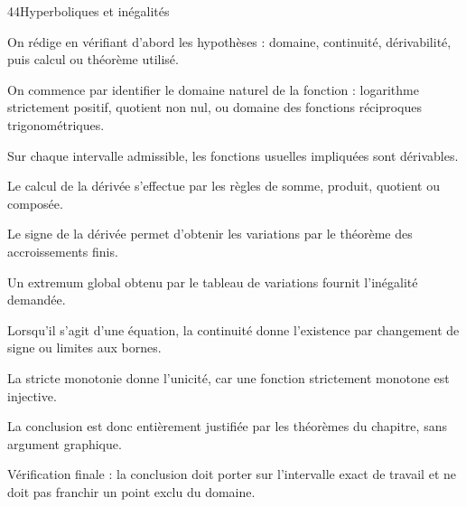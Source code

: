 \documentclass[11pt,a4paper]{article}
\begin{document}
\begin{corrbox}{44}{Hyperboliques et inégalités}

\begin{methodebox}
On rédige en vérifiant d'abord les hypothèses : domaine, continuité, dérivabilité, puis calcul ou théorème utilisé.
\end{methodebox}

On commence par identifier le domaine naturel de la fonction : logarithme strictement positif, quotient non nul, ou domaine des fonctions réciproques trigonométriques.


Sur chaque intervalle admissible, les fonctions usuelles impliquées sont dérivables.


Le calcul de la dérivée s'effectue par les règles de somme, produit, quotient ou composée.


Le signe de la dérivée permet d'obtenir les variations par le théorème des accroissements finis.


Un extremum global obtenu par le tableau de variations fournit l'inégalité demandée.


Lorsqu'il s'agit d'une équation, la continuité donne l'existence par changement de signe ou limites aux bornes.


La stricte monotonie donne l'unicité, car une fonction strictement monotone est injective.


La conclusion est donc entièrement justifiée par les théorèmes du chapitre, sans argument graphique.


\begin{attentionbox}
Vérification finale : la conclusion doit porter sur l'intervalle exact de travail et ne doit pas franchir un point exclu du domaine.
\end{attentionbox}

\end{corrbox}
\end{document}
